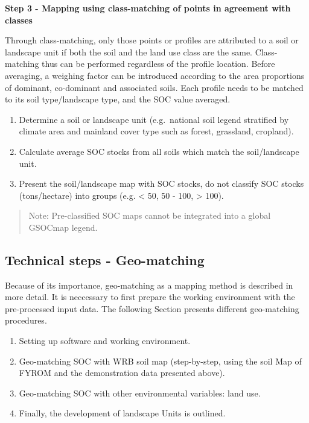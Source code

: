 \documentclass[10pt,b5paper,]{book}
\providecommand{\tightlist}{%
  \setlength{\itemsep}{0pt}\setlength{\parskip}{0pt}}
\theoremstyle{definition}
\theoremstyle{definition}
\theoremstyle{definition}
\theoremstyle{remark}
\begin{document}
\textbf{Step 3 - Mapping using class-matching of points in agreement
with classes}

Through class-matching, only those points or profiles are attributed to
a soil or landscape unit if both the soil and the land use class are the
same. Class-matching thus can be performed regardless of the profile
location. Before averaging, a weighing factor can be introduced
according to the area proportions of dominant, co-dominant and
associated soils. Each profile needs to be matched to its soil
type/landscape type, and the SOC value averaged.

\begin{enumerate}
\def\labelenumi{\arabic{enumi}.}
\tightlist
\item
  Determine a soil or landscape unit (e.g.~national soil legend
  stratified by climate area and mainland cover type such as forest,
  grassland, cropland).
\item
  Calculate average SOC stocks from all soils which match the
  soil/landscape unit.
\item
  Present the soil/landscape map with SOC stocks, do not classify SOC
  stocks (tons/hectare) into groups (e.g. \textless{} 50, 50 - 100,
  \textgreater{} 100).
\end{enumerate}

\begin{quote}
Note: Pre-classified SOC maps cannot be integrated into a global GSOCmap
legend.
\end{quote}

\hypertarget{geomQGIS}{%
\subsection{Technical steps - Geo-matching}\label{geomQGIS}}

Because of its importance, geo-matching as a mapping method is described
in more detail. It is neccessary to first prepare the working
environment with the pre-processed input data. The following Section
presents different geo-matching procedures.

\begin{enumerate}
\def\labelenumi{\arabic{enumi}.}
\tightlist
\item
  Setting up software and working environment.
\item
  Geo-matching SOC with WRB soil map (step-by-step, using the soil Map
  of FYROM and the demonstration data presented above).
\item
  Geo-matching SOC with other environmental variables: land use.
\item
  Finally, the development of landscape Units \citep{lettens2004soil} is
  outlined.
\end{enumerate}
\end{document}
